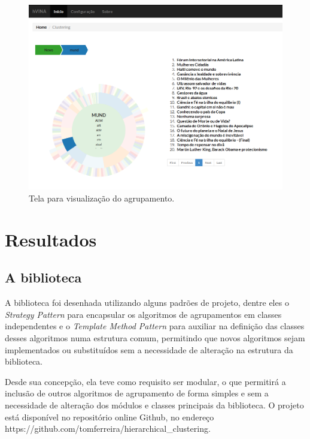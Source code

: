 \documentclass[a4paper,12pt]{article}
\begin{document}
\begin{figure}[H]
    \begin{center}
        \includegraphics[scale=0.35]{hvina_clustering.png}
    \end{center}
    \caption{Tela para visualização do agrupamento.}
    \label{fig:hvina_clustering}
\end{figure}

\section {Resultados}
\label {sec:resultados}

\subsection {A biblioteca}
\label {sec:a_biblioteca}

A biblioteca foi desenhada utilizando alguns padrões de projeto, dentre eles o \emph{Strategy Pattern} para encapsular os algoritmos de agrupamentos em classes independentes e o \emph{Template Method Pattern} para auxiliar na definição das classes desses algoritmos numa estrutura comum, permitindo que novos algoritmos sejam implementados ou substituídos sem a necessidade de alteração na estrutura da biblioteca.

Desde sua concepção, ela teve como requisito ser modular, o que permitirá a inclusão de outros algoritmos de agrupamento de forma simples e sem a necessidade de alteração dos módulos e classes principais da biblioteca. O projeto está disponível no repositório online Github, no endereço https://github.com/tomferreira/hierarchical\_clustering.
\end{document}
